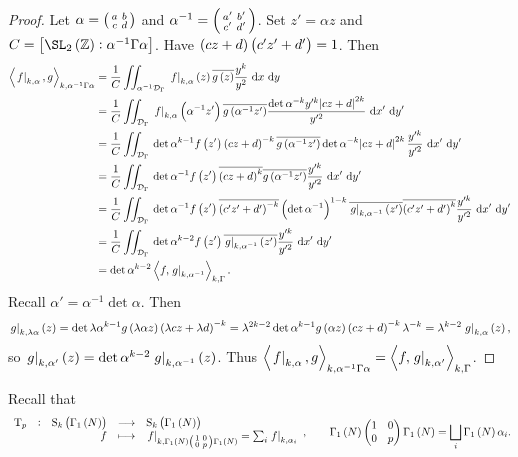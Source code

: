 \begin{proof}
Let $ \alpha = \begin{psmallmatrix} a & b \\ c & d \end{psmallmatrix} $ and $ \alpha^{-1} = \begin{psmallmatrix} a' & b' \\ c' & d' \end{psmallmatrix} $. Set $ z' = \alpha z $ and $ C = \sbr{\SL_2\br{\ZZ} : \alpha^{-1}\Gamma\alpha} $. Have $ \br{cz + d}\br{c'z' + d'} = 1 $. Then
\begin{align*}
\abr{\eval{f}_{k, \alpha}, g}_{k, \alpha^{-1}\Gamma\alpha}
& = \dfrac{1}{C}\iintd{\alpha^{-1}\DDD_\Gamma}{\eval{f}_{k, \alpha}\br{z}\overline{g\br{z}}\dfrac{y^k}{y^2}}{x}{y} \\
& = \dfrac{1}{C}\iintd{\DDD_\Gamma}{\eval{f}_{k, \alpha}\br{\alpha^{-1}z'}\overline{g\br{\alpha^{-1}z'}}\dfrac{\det \alpha^{-k}y'^k\abs{cz + d}^{2k}}{y'^2}}{x'}{y'} \\
& = \dfrac{1}{C}\iintd{\DDD_\Gamma}{\det \alpha^{k - 1}f\br{z'}\br{cz + d}^{-k}\overline{g\br{\alpha^{-1}z'}}\det \alpha^{-k}\abs{cz + d}^{2k}\dfrac{y'^k}{y'^2}}{x'}{y'} \\
& = \dfrac{1}{C}\iintd{\DDD_\Gamma}{\det \alpha^{-1}f\br{z'}\overline{\br{cz + d}^k}\overline{g\br{\alpha^{-1}z'}}\dfrac{y'^k}{y'^2}}{x'}{y'} \\
& = \dfrac{1}{C}\iintd{\DDD_\Gamma}{\det \alpha^{-1}f\br{z'}\overline{\br{c'z' + d'}^{-k}}\br{\det \alpha^{-1}}^{1 - k}\overline{\eval{g}_{k, \alpha^{-1}}\br{z'}}\overline{\br{c'z' + d'}^k}\dfrac{y'^k}{y'^2}}{x'}{y'} \\
& = \dfrac{1}{C}\iintd{\DDD_\Gamma}{\det \alpha^{k - 2}f\br{z'}\overline{\eval{g}_{k, \alpha^{-1}}\br{z'}}\dfrac{y'^k}{y'^2}}{x'}{y'} \\
& = \det \alpha^{k - 2}\abr{f, \eval{g}_{k, \alpha^{-1}}}_{k, \Gamma}.
\end{align*}
Recall $ \alpha' = \alpha^{-1}\det \alpha $. Then
$$ \eval{g}_{k, \lambda\alpha}\br{z} = \det \lambda\alpha^{k - 1}g\br{\lambda\alpha z}\br{\lambda cz + \lambda d}^{-k} = \lambda^{2k - 2}\det \alpha^{k - 1}g\br{\alpha z}\br{cz + d}^{-k}\lambda^{-k} = \lambda^{k - 2}\eval{g}_{k, \alpha}\br{z}, $$
so $ \eval{g}_{k, \alpha'}\br{z} = \det \alpha^{k - 2}\eval{g}_{k, \alpha^{-1}}\br{z} $. Thus $ \left\langle \left. f \right|_{k, \alpha}, g \right\rangle_{k, \alpha^{-1}\Gamma\alpha} = \left\langle f, \left. g \right|_{k, \alpha'} \right\rangle_{k, \Gamma} $.
\end{proof}


Recall that
$$ \function[\T_p]{\S_k\br{\Gamma_1\br{N}}}{\S_k\br{\Gamma_1\br{N}}}{f}{\eval{f}_{k, \Gamma_1\br{N}\twobytwosmall{1}{0}{0}{p}\Gamma_1\br{N}} = \sum_i \eval{f}_{k, \alpha_i}}, \qquad \Gamma_1\br{N}\twobytwo{1}{0}{0}{p}\Gamma_1\br{N} = \bigsqcup_i \Gamma_1\br{N}\alpha_i. $$

